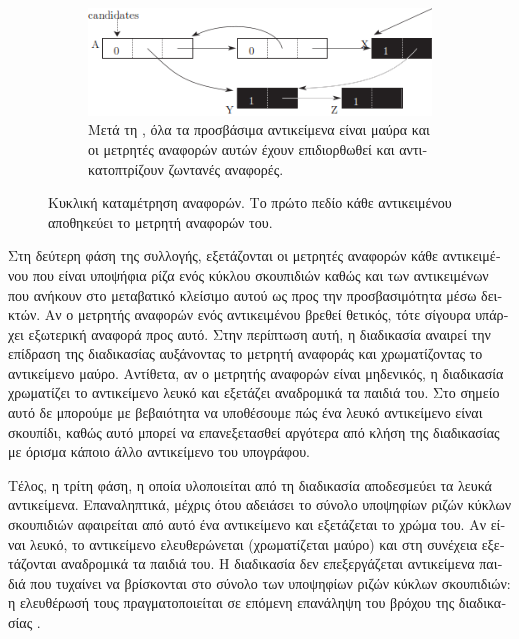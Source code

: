 \begin{greek}
\begin{figure}[H]
  \begin{subfigure}[b]{1.0\textwidth}
    \includegraphics{figures/refcnt_2c}
    \caption
      {Μετά τη , όλα τα προσβάσιμα αντικείμενα
       είναι μαύρα και οι μετρητές αναφορών αυτών έχουν
       επιδιορθωθεί και αντικατοπτρίζουν ζωντανές αναφορές.}
  \end{subfigure}
  \caption[Κυκλική καταμέτρηση αναφορών.]
    {Κυκλική καταμέτρηση αναφορών. Το πρώτο πεδίο κάθε
     αντικειμένου αποθηκεύει το μετρητή αναφορών του.}
  \label{fig:refcnt_2}
\end{figure}

Στη δεύτερη φάση της συλλογής, εξετάζονται οι μετρητές
αναφορών κάθε αντικειμένου που είναι υποψήφια ρίζα ενός
κύκλου σκουπιδιών καθώς και των αντικειμένων που ανήκουν
στο μεταβατικό κλείσιμο αυτού ως προς την προσβασιμότητα
μέσω δεικτών. Αν ο μετρητής αναφορών ενός αντικειμένου
βρεθεί θετικός, τότε σίγουρα υπάρχει εξωτερική αναφορά
προς αυτό. Στην περίπτωση αυτή, η διαδικασία
 αναιρεί την επίδραση της διαδικασίας
 αυξάνοντας το μετρητή αναφοράς και
χρωματίζοντας το αντικείμενο μαύρο. Αντίθετα, αν ο μετρητής
αναφορών είναι μηδενικός, η διαδικασία 
χρωματίζει το αντικείμενο λευκό και εξετάζει αναδρομικά τα
παιδιά του. Στο σημείο αυτό δε μπορούμε με βεβαιότητα να
υποθέσουμε πώς ένα λευκό αντικείμενο είναι σκουπίδι, καθώς
αυτό μπορεί να επανεξετασθεί αργότερα από κλήση της
διαδικασίας  με όρισμα κάποιο άλλο
αντικείμενο του υπογράφου.

Τέλος, η τρίτη φάση, η οποία υλοποιείται από τη διαδικασία
 αποδεσμεύει τα λευκά αντικείμενα.
Επαναληπτικά, μέχρις ότου αδειάσει το σύνολο υποψηφίων ριζών
κύκλων σκουπιδιών αφαιρείται από αυτό ένα αντικείμενο και
εξετάζεται το χρώμα του. Αν είναι λευκό, το αντικείμενο
ελευθερώνεται (χρωματίζεται μαύρο) και στη συνέχεια
εξετάζονται αναδρομικά τα παιδιά του. Η διαδικασία
 δεν επεξεργάζεται αντικείμενα
παιδιά που τυχαίνει να βρίσκονται στο σύνολο των υποψηφίων
ριζών κύκλων σκουπιδιών: η ελευθέρωσή τους πραγματοποιείται
σε επόμενη επανάληψη του βρόχου της διαδικασίας
.


\end{greek}
